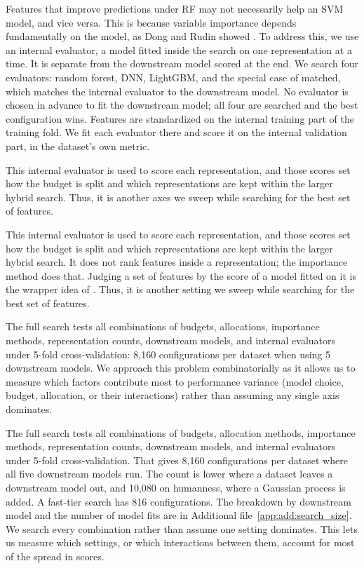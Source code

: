 Features that improve predictions under RF may not necessarily help an SVM model, and vice versa. This is because variable importance depends fundamentally on the model, as Dong and Rudin showed \citep{Dong2020}. To address this, we use an internal evaluator, a model fitted inside the search on one representation at a time. It is separate from the downstream model scored at the end. We search four evaluators: random forest, DNN, LightGBM, and the special case of matched, which matches the internal evaluator to the downstream model. No evaluator is chosen in advance to fit the downstream model; all four are searched and the best configuration wins. Features are standardized on the internal training part of the training fold. We fit each evaluator there and score it on the internal validation part, in the dataset's own metric.

This internal evaluator is used to score each representation, and those scores set how the budget is split and which representations are kept within the larger hybrid search. Thus, it is another axes we sweep while searching for the best set of features.

This internal evaluator is used to score each representation, and those scores set how the budget is split and which representations are kept within the larger hybrid search. It does not rank features inside a representation; the importance method does that. Judging a set of features by the score of a model fitted on it is the wrapper idea of \citet{Kohavi1997}. Thus, it is another setting we sweep while searching for the best set of features.



The full search tests all combinations of budgets, allocations, importance methods, representation counts, downstream models, and internal evaluators under 5-fold cross-validation: 8,160 configurations per dataset when using 5 downstream models. We approach this problem combinatorially as it allows us to measure which factors contribute most to performance variance (model choice, budget, allocation, or their interactions) rather than assuming any single axis dominates.

The full search tests all combinations of budgets, allocation methods, importance methods, representation counts, downstream models, and internal evaluators under 5-fold cross-validation. That gives 8,160 configurations per dataset where all five downstream models run. The count is lower where a dataset leaves a downstream model out, and 10,080 on humanness, where a Gaussian process is added. A fast-tier search has 816 configurations. The breakdown by downstream model and the number of model fits are in Additional file~\ref{app:add:search_size}. We search every combination rather than assume one setting dominates. This lets us measure which settings, or which interactions between them, account for most of the spread in scores.

